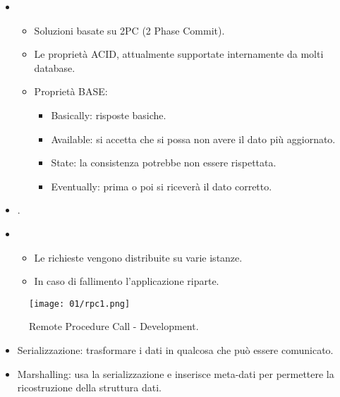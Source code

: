\begin{itemize}
  \item {}
    \begin{itemize}
      \item Soluzioni basate su 2PC (2 Phase Commit). 
      \item Le proprietà ACID, attualmente supportate internamente da molti database. 
      \item Proprietà BASE: 
        \begin{itemize}
          \item Basically: risposte basiche.
          \item Available: si accetta che si possa non avere il dato più aggiornato. 
          \item State: la consistenza potrebbe non essere rispettata.
          \item Eventually: prima o poi si riceverà il dato corretto.
        \end{itemize}
    \end{itemize}
  \item {}. 
  \item {}
    \begin{itemize}
      \item Le richieste vengono distribuite su varie istanze. 
      \item In caso di fallimento l'applicazione riparte.
    \end{itemize}
\end{itemize}


\begin{figure}[h]
    \centering
    \texttt{[image: 01/rpc1.png]}
    \caption{Remote Procedure Call - Development.}
\end{figure}

\begin{itemize}
  \item Serializzazione: trasformare i dati in qualcosa che può essere comunicato.
  \item Marshalling: usa la serializzazione e inserisce meta-dati per permettere la ricostruzione della struttura dati.
\end{itemize}

